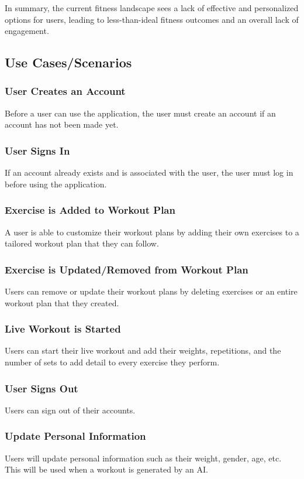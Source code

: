 \documentclass[12pt]{article}
\begin{document}
In summary, the current fitness landscape sees a lack of effective and personalized options for users, leading to less-than-ideal fitness outcomes and an overall lack of engagement.

\subsection{Use Cases/Scenarios}

\subsubsection{User Creates an Account}
Before a user can use the application, the user must create an account if an account has not been made yet.

\subsubsection{User Signs In}
If an account already exists and is associated with the user, the user must log in before using the application.

\subsubsection{Exercise is Added to Workout Plan}
A user is able to customize their workout plans by adding their own exercises to a tailored workout plan that they can follow.

\subsubsection{Exercise is Updated/Removed from Workout Plan}
Users can remove or update their workout plans by deleting exercises or an entire workout plan that they created.

\subsubsection{Live Workout is Started}
Users can start their live workout and add their weights, repetitions, and the number of sets to add detail to every exercise they perform.

\subsubsection{User Signs Out}
Users can sign out of their accounts.

\subsubsection{Update Personal Information}
Users will update personal information such as their weight, gender, age, etc. This will be used when a workout is generated by an AI.
\end{document}
